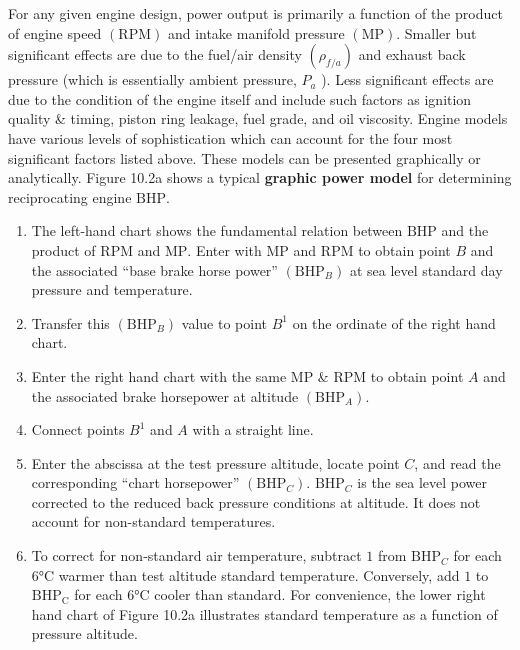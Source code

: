 \documentclass[
]{book}
\providecommand{\tightlist}{%
  \setlength{\itemsep}{0pt}\setlength{\parskip}{0pt}}
\begin{document}
For any given engine design, power output is primarily a function of the product of engine speed \(\left( \mathrm{RPM} \right)\) and intake manifold pressure \(\left( \mathrm{MP} \right)\).
Smaller but significant effects are due to the fuel/air density \(\left( \rho_{f/a} \right)\) and exhaust back pressure (which is essentially ambient pressure, \(P_a\) ).
Less significant effects are due to the condition of the engine itself and include such factors as ignition quality \& timing, piston ring leakage, fuel grade, and oil viscosity.
Engine models have various levels of sophistication which can account for the four most significant factors listed above.
These models can be presented graphically or analytically.
Figure 10.2a shows a typical \textbf{graphic power model} for determining reciprocating engine \(\mathrm{BHP}\).

\begin{enumerate}
\def\labelenumi{\arabic{enumi}.}
\tightlist
\item
  The left-hand chart shows the fundamental relation between \(\mathrm{BHP}\) and the product of \(\mathrm{RPM}\) and \(\mathrm{MP}.\) Enter with \(\mathrm{MP}\) and \(\mathrm{RPM}\) to obtain point \(B\) and the associated ``base brake horse power'' \(\left( \mathrm{BHP}_B \right)\) at sea level standard day pressure and temperature.
\item
  Transfer this \(\left( \mathrm{BHP}_B \right)\) value to point \(B^1\) on the ordinate of the right hand chart.
\item
  Enter the right hand chart with the same \(\mathrm{MP}\) \& \(\mathrm{RPM}\) to obtain point \(A\) and the associated brake horsepower at altitude \(\left( \mathrm{BHP}_A \right)\).
\item
  Connect points \(B^1\) and \(A\) with a straight line.
\item
  Enter the abscissa at the test pressure altitude, locate point \(C\), and read the corresponding ``chart horsepower'' \(\left( \mathrm{BHP}_C \right)\). \(\mathrm{BHP}_C\) is the sea level power corrected to the reduced back pressure conditions at altitude. It does not account for non-standard temperatures.
\item
  To correct for non-standard air temperature, subtract \(1%
  \) from \(\mathrm{BHP}_C\) for each \(6°\text{C}\) warmer than test altitude standard temperature. Conversely, add \(1%
  \) to \(\mathrm{BHP}_\text{C}\) for each \(6°\text{C}\) cooler than standard. For convenience, the lower right hand chart of Figure 10.2a illustrates standard temperature as a function of pressure altitude.
\end{enumerate}
\end{document}
